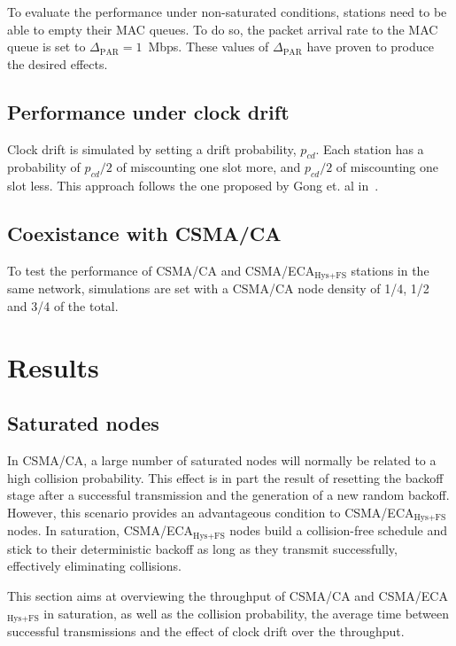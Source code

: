 \documentclass[a4paper,journal]{IEEEtran}
\begin{document}
	To evaluate the performance under non-saturated conditions, stations need to be able to empty their MAC queues. To do so, the packet arrival rate to the MAC queue is set to $\Delta_{\text{PAR}}=1$~Mbps. These values of $\Delta_{\text{PAR}}$ have proven to produce the desired effects.
	
	\subsection{Performance under clock drift}
	Clock drift is simulated by setting a drift probability, $p_{cd}$. Each station has a probability of $p_{cd}/2$ of miscounting one slot more, and $p_{cd}/2$ of miscounting one slot less. This approach follows the one proposed by Gong et. al in~\cite{slotDrift}.
	
	\subsection{Coexistance with CSMA/CA}\label{coexistence}
	To test the performance of CSMA/CA and CSMA/ECA$_{\text{Hys+FS}}$ stations in the same network, simulations are set with a CSMA/CA node density of 1/4, 1/2 and 3/4 of the total.
	

\section{Results}\label{results}

	\subsection{Saturated nodes}\label{resultsSaturated}
	In CSMA/CA, a large number of saturated nodes will normally be related to a high collision probability. This effect is in part the result of resetting the backoff stage after a successful transmission and the generation of a new random backoff. However, this scenario provides an advantageous condition to CSMA/ECA$_{\text{Hys+FS}}$ nodes. In saturation, CSMA/ECA$_{\text{Hys+FS}}$ nodes build a collision-free schedule and stick to their deterministic backoff as long as they transmit successfully, effectively eliminating collisions.
	
	This section aims at overviewing the throughput of CSMA/CA and CSMA/ECA$_{\text{Hys+FS}}$ in saturation, as well as the collision probability, the average time between successful transmissions and the effect of clock drift over the throughput.
	\\
\end{document}
